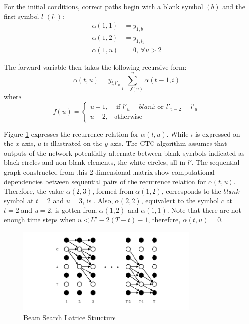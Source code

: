 For the initial conditions, correct paths begin with a blank symbol $(b)$ and the first symbol $l$ $(l_1)$:
\begin{equation}
\begin{aligned}\alpha(1, 1) &= y_{1,b} \\ \alpha(1, 2) &= y_{1,l_1} \\ \alpha(1, u) &= 0, \, \forall u > 2 \end{aligned}
\label{eqn_c3_ctc05}\end{equation}

The forward variable then takes the following recursive form:
\begin{equation}
\alpha(t,u) = y_{t, l'_u} \sum_{i = f(u)}^{u} \alpha(t-1, i)
\label{eqn_c3_ctc06}\end{equation}
where
\begin{equation}
f(u) =\begin{cases}u-1, & \text{ if } l'_u = blank \text{ or } l'_{u-2} = l'_{u} \\ u-2, & \text{otherwise}\end{cases}
\label{eqn_c3_ctc07}
\end{equation}

Figure \ref{fig_c4_lattice} expresses the recurrence relation for $\alpha(t, u)$. While $t$ is expressed on the $x$ axis, $u$ is illustrated on the $y$ axis. The CTC algorithm assumes that outputs of the network potentially alternate between blank symbols indicated as black circles  and non-blank elements, the white circles, all in $l'$.  The sequential graph constructed from this 2-dimensional matrix show computational dependencies between sequential pairs of the recurrence relation for $\alpha(t,u)$. Therefore, the value $\alpha(2,3)$, formed from $\alpha(1,2)$, corresponds to the $blank$ symbol at $t=2$ and $u=3$, is . Also,  $\alpha(2,2)$, equivalent to the symbol $c$ at $t=2$ and $u=2$, is gotten from $\alpha(1,2)$ and $\alpha(1,1)$.  Note that there are not enough time steps when $u < U'−2(T−t)−1$, therefore, $\alpha(t,u)=0$. 

\begin{figure}
\centering
  \includegraphics[width=9cm]{thesis/images/Lattice.png}
  \caption{Beam Search Lattice Structure \citep{graves2006connectionist}}
\label{fig_c4_lattice}
\end{figure}

